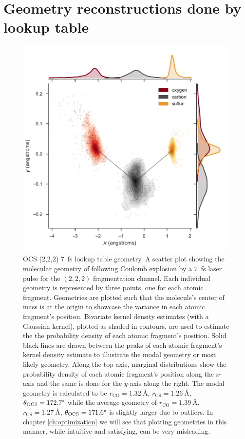 \section{Geometry reconstructions done by lookup table}

\pagebreak
\begin{figure}
  \centering
  \includegraphics[width=\textwidth]{Plots/OCS2227fsLTGeometry}
  \caption[OCS (2,2,2) \SI{7}{\fs} geometry reconstruction by lookup table.]
  {OCS (2,2,2) \SI{7}{\fs} lookup table geometry. A scatter plot showing the molecular geometry of  following Coulomb explosion by a \SI{7}{\fs} laser pulse for the $(2,2,2)$ fragmentation channel. Each individual geometry is represented by three points, one for each atomic fragment. Geometries are plotted such that the molecule's center of mass is at the origin to showcase the variance in each atomic fragment's position. Bivariate kernel density estimates (with a Gaussian kernel), plotted as shaded-in contours, are used to estimate the the probability density of each atomic fragment's position. Solid black lines are drawn between the peaks of each atomic fragment's kernel density estimate to illustrate the modal geometry or most likely geometry. Along the top axis, marginal distributions show the probability density of each  atomic fragment's position along the $x$-axis and the same is done for the $y$-axis along the right. The modal geometry is calculated to be $r_\mathrm{CO} = \SI{1.32}{\angstrom}$, $r_\mathrm{CS} = \SI{1.26}{\angstrom}$, $ \theta_\mathrm{OCS} = 172.7\degree$ while the average geometry of $r_\mathrm{CO} = \SI{1.39}{\angstrom}$, $r_\mathrm{CS} = \SI{1.27}{\angstrom}$, $ \theta_\mathrm{OCS} = 171.6\degree$ is slightly larger due to outliers. In chapter \ref{ch:optimization} we will see that plotting geometries in this manner, while intuitive and satisfying, can be very misleading.}
  \label{fig:OCS2227fsLTGeometry}
\end{figure}

